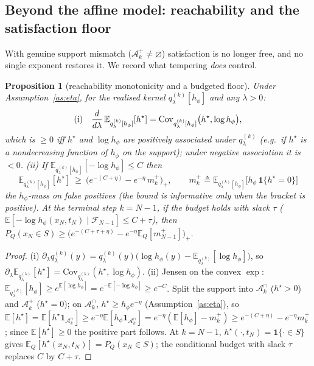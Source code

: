 \documentclass[11pt]{article}
\newcommand{\E}{\mathbb{E}}
\newcommand{\Cov}{\mathrm{Cov}}
\newcommand{\Aset}{\mathcal{A}}
\newcommand{\F}{\mathcal{F}}
\newcommand{\hs}{h^\star}
\theoremstyle{plain}
\newtheorem{proposition}{Proposition}
\theoremstyle{definition}
\theoremstyle{remark}
\begin{document}
\subsection{Beyond the affine model: reachability and the satisfaction floor}

With genuine support mismatch ($\Aset^+_k\ne\varnothing$) satisfaction is no longer free, and
no single exponent restores it. We record what tempering \emph{does} control.

\begin{proposition}[reachability monotonicity and a budgeted floor]
\label{prop:eta-reach}
Under Assumption~\ref{as:eta}, for the realised kernel $q^{(k)}_\lambda[h_\phi]$ and any $\lambda>0$:
\begin{gather*}
\textup{(i)}\quad \frac{d}{d\lambda}\,\E_{q^{(k)}_\lambda[h_\phi]}[\hs]
=\Cov_{q^{(k)}_\lambda[h_\phi]}\big(\hs,\log h_\phi\big),
\end{gather*}
which is $\ge0$ iff $\hs$ and $\log h_\phi$ are positively associated under $q^{(k)}_\lambda$
(e.g.\ if $\hs$ is a nondecreasing function of $h_\phi$ on the support); under negative
association it is $<0$. \textup{(ii)} If $\E_{q^{(k)}_\lambda[h_\phi]}[-\log h_\phi]\le C$ then
\[
\E_{q^{(k)}_\lambda[h_\phi]}[\hs]\ \ge\ \big(e^{-(C+\eta)}-e^{-\eta}\,m^+_k\big)_+,
\qquad m^+_k\triangleq\E_{q^{(k)}_\lambda[h_\phi]}\big[h_\phi\,\mathbf 1\{\hs=0\}\big]
\]
the $h_\phi$-mass on false positives (the bound is informative only when the bracket is positive).
At the terminal step $k=N-1$, if the budget holds with slack $\tau$
($\E[-\log h_\phi(x_N,t_N)\mid\F_{N-1}]\le C+\tau$), then
$P_Q(x_N\in S)\ge\big(e^{-(C+\tau+\eta)}-e^{-\eta}\E_Q[m^+_{N-1}]\big)_+$.
\end{proposition}
\begin{proof}
(i) $\partial_\lambda q^{(k)}_\lambda(y)=q^{(k)}_\lambda(y)\big(\log h_\phi(y)-\E_{q^{(k)}_\lambda}[\log h_\phi]\big)$,
so $\partial_\lambda\E_{q^{(k)}_\lambda}[\hs]=\Cov_{q^{(k)}_\lambda}(\hs,\log h_\phi)$.
(ii) Jensen on the convex $\exp$: $\E_{q^{(k)}_\lambda}[h_\phi]\ge e^{\E[\log h_\phi]}=e^{-\E[-\log h_\phi]}\ge e^{-C}$.
Split the support into $\Aset^\cap_k$ ($\hs>0$) and $\Aset^+_k$ ($\hs=0$); on $\Aset^\cap_k$,
$\hs\ge h_\phi e^{-\eta}$ (Assumption~\ref{as:eta}), so
$\E[\hs]=\E[\hs\mathbf 1_{\Aset^\cap_k}]\ge e^{-\eta}\E[h_\phi\mathbf 1_{\Aset^\cap_k}]
=e^{-\eta}(\E[h_\phi]-m^+_k)\ge e^{-(C+\eta)}-e^{-\eta}m^+_k$; since $\E[\hs]\ge0$ the positive part follows.
At $k=N-1$, $\hs(\cdot,t_N)=\mathbf 1\{\cdot\in S\}$ gives $\E_Q[\hs(x_N,t_N)]=P_Q(x_N\in S)$;
the conditional budget with slack $\tau$ replaces $C$ by $C+\tau$.
\end{proof}
\end{document}
